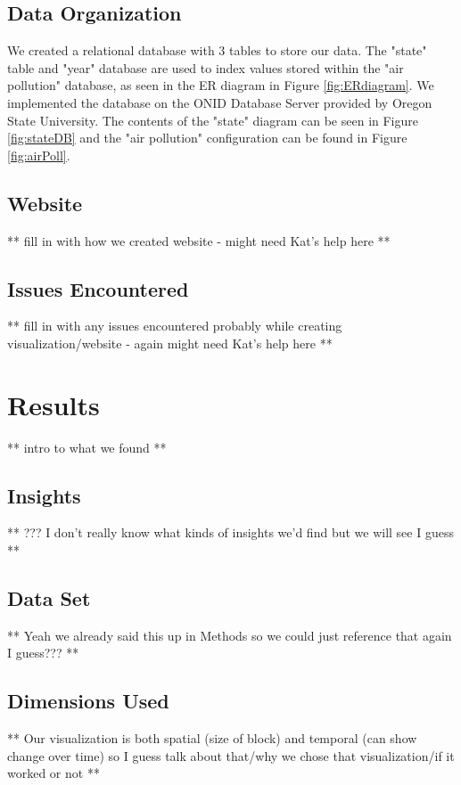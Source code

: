 \documentclass[journal]{vgtc}                %
\begin{document}
\subsection{Data Organization}
We created a relational database with 3 tables to store our data. The "state" table and "year" database are used to
index values stored within the "air pollution" database, as seen in the ER diagram in Figure \ref{fig:ERdiagram}.
We implemented the database on the ONID Database Server provided by Oregon State University. The contents
of the "state" diagram can be seen in Figure \ref{fig:stateDB} and the "air pollution" configuration can be found in Figure \ref{fig:airPoll}.

\subsection{Website}
** fill in with how we created website - might need Kat's help here **

\subsection{Issues Encountered}
** fill in with any issues encountered probably while creating visualization/website - again might need Kat's help here **

\section{Results}
** intro to what we found **

\subsection{Insights}

** ??? I don't really know what kinds of insights we'd find but we will see I guess **

\subsection{Data Set}

** Yeah we already said this up in Methods so we could just reference that again I guess??? **

\subsection{Dimensions Used}

** Our visualization is both spatial (size of block) and temporal (can show change over time) so I guess talk about that/why we chose that visualization/if it worked or not **
\end{document}
